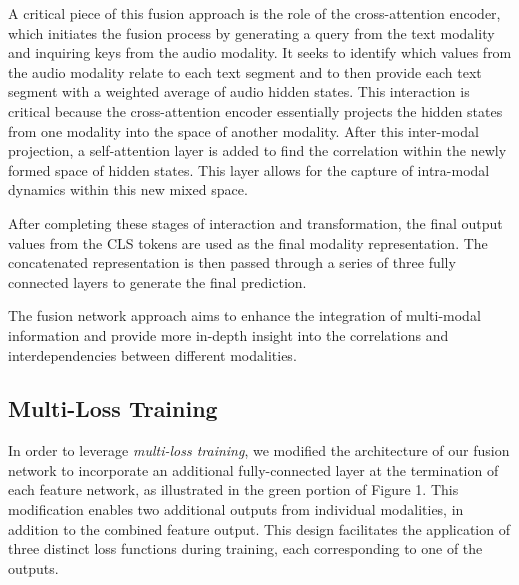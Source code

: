 \documentclass[11pt]{article}
\begin{document}
A critical piece of this fusion approach is the role of the cross-attention encoder, which initiates the fusion process by generating a query from the text modality and inquiring keys from the audio modality. It seeks to identify which values from the audio modality relate to each text segment and to then provide each text segment with a weighted average of audio hidden states.  This interaction is critical because the cross-attention encoder essentially projects the hidden states from one modality into the space of another modality. After this inter-modal projection, a self-attention layer is added to find the correlation within the newly formed space of hidden states. This layer allows for the capture of intra-modal dynamics within this new mixed space.

After completing these stages of interaction and transformation, the final output values from the CLS tokens are used as the final modality representation. The concatenated representation is then passed through a series of three fully connected layers to generate the final prediction.

The fusion network approach aims to enhance the integration of multi-modal information and provide more in-depth insight into the correlations and interdependencies between different modalities.


\subsection{Multi-Loss Training}
In order to leverage {\it multi-loss training}, we modified the architecture of our fusion network to incorporate an additional fully-connected layer at the termination of each feature network, as illustrated in the green portion of Figure 1. This modification enables two additional outputs from individual modalities, in addition to the combined feature output. This design facilitates the application of three distinct loss functions during training, each corresponding to one of the outputs. 
\end{document}
